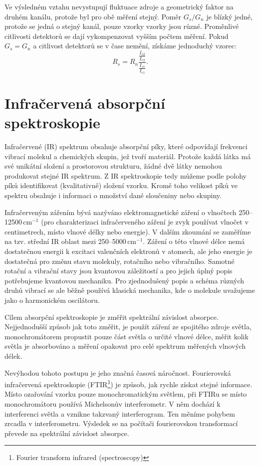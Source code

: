 \documentclass[12pt,oneside,final]{fithesis2}
\begin{document}
Ve výsledném vztahu nevystupují fluktuace zdroje a geometrický faktor na druhém kanálu, protože byl pro obě měření stejný. Poměr $G_s/G_n$ je blízký jedné, protože se jedná o stejný kanál, pouze vzorky vzorky jsou různé. Proměnlivé citlivosti detektorů se dají vykompenzovat vyšším počtem měření. Pokud $G_s = G_n$ a citlivost detektorů se v čase nemění, získáme jednoduchý vzorec:
\begin{equation}R_s = R_n \frac{ \displaystyle\frac{I_{s2}}{I_{r2}} }{ \displaystyle\frac{I_{s1}}{I_{r1}} } \mathrm{.}\end{equation}



\section {Infračervená absorpční spektroskopie}
Infračervené (IR) spektrum obsahuje absorpční píky, které odpovídají frekvenci vibrací molekul a chemických skupin, jež tvoří materiál. Protože každá látka má své unikátní složení a prostorovou strukturu, žádné dvě látky nemohou produkovat stejné IR spektrum. Z IR spektroskopie tedy můžeme podle polohy píků identifikovat (kvalitativně) složení vzorku. Kromě toho velikost píků ve spektru obsahuje i informaci o množství dané sloučeniny nebo skupiny.

Infračerveným zářením bývá nazýváno elektromagnetické záření o vlnočtech 250--12500\,cm$^{-1}$ (pro charakterizaci infračerveného záření je zvyk používat vlnočet v centimetrech, místo vlnové délky nebo energie). V dalším zkoumání se zaměříme na tzv. střední IR oblast mezi 250--5000\,cm$^{-1}$. Záření o této vlnové délce nemá dostatečnou energii k excitaci valenčních elektronů v atomech, ale jeho energie je dostatečná pro změnu stavu molekuly, rotačního nebo vibračního. Samotné rotační a vibrační stavy jsou kvantovou záležitostí a pro jejich úplný popis potřebujeme kvantovou mechaniku. Pro zjednodušený popis a schéma různých druhů vibrací se ale běžně používá klasická mechanika, kde o molekule uvažujeme jako o harmonickém oscilátoru.

Cílem absorpční spektroskopie je změřit spektrální závislost absorpce. Nejjednodušší způsob jak toto změřit, je použít záření ze spojitého zdroje světla, monochromátorem propustit pouze část světla o určité vlnové délce, měřit kolik světla je absorbováno a měření opakovat pro celé spektrum měřených vlnových délek. 

Nevýhodou tohoto postupu je jeho značná časová náročnost. Fourierovská infračervená spektroskopie (FTIR\footnote{Fourier transform infrared (spectroscopy)}) je způsob, jak rychle získat stejné informace. Místo ozařování vzorku pouze monochromatickým světlem, při FTIRu se místo mono\-chromátoru používá Michelsonův interferometr. V něm dochází k interferenci světla a vznik\-ne takzvaný interferogram. Ten měníme pohybem zrcadla v interferometru. Výsledek se na počítači fourierovskou transformací převede na spektrální závislost absorpce.
\end{document}
